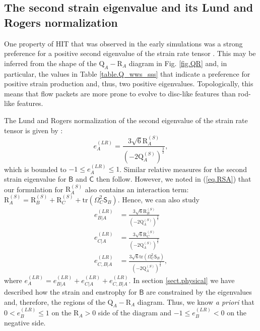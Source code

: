 \documentclass[preprint,amssymb,amsmath,aip,cha]{revtex4-1}
\begin{document}
\subsection{The second strain eigenvalue and its {L}und and {R}ogers normalization}
\label{sect.eLRABC}
One property of HIT that was observed in the early simulations was a strong preference for a positive second eigenvalue of the strain rate tensor \citep{kerr85,ashurst87}. This may be inferred from the shape of the $\mbox{Q}_{A}-\mbox{R}_{A}$ diagram in Fig. \ref{fig.QR} and, in particular, the values in Table \ref{table.Q_wws_sss} that indicate a preference for positive strain production and, thus, two positive eigenvalues. Topologically, this means that flow packets are more prone to evolve to disc-like features than rod-like features. 

The Lund and Rogers normalization of the second eigenvalue of the strain rate tensor is given by \citep{LR94}:
\begin{equation}
e^{(LR)}_{A} = \frac{3\sqrt{6}\mbox{R}^{(S)}_{A}}{\left(-2\mbox{Q}^{(S)}_{A} \right)^{\frac{3}{2}}},
\end{equation}
which is bounded to $-1 \le e^{(LR)}_{A} \le 1$. Similar relative measures for the second strain eigenvalue for $\mathsf{B}$ and $\mathsf{C}$ then follow. However, we noted in (\ref{eq.RSA}) that our formulation for $\mbox{R}^{(S)}_{A}$ also contains an interaction term: $\mbox{R}_{A}^{(S)} = \mbox{R}^{(S)}_{B} + \mbox{R}^{(S)}_{C} +\mbox{tr}(\mathsf{\Omega}_{C}^{2}\mathsf{S}_{B})$. Hence, we can also study
\begin{align}
e^{(LR)}_{B|A} &= \frac{3\sqrt{6}\mbox{R}^{(S)}_{B}}{\left(-2\mbox{Q}^{(S)}_{A} \right)^{\frac{3}{2}}}\\
e^{(LR)}_{C|A} &= \frac{3\sqrt{6}\mbox{R}^{(S)}_{C}}{\left(-2\mbox{Q}^{(S)}_{A} \right)^{\frac{3}{2}}}\\
e^{(LR)}_{C,B|A} &= \frac{3\sqrt{6} \mbox{tr}(\mathsf{\Omega}_{C}^{2}\mathsf{S}_{B})}{\left(-2\mbox{Q}^{(S)}_{A} \right)^{\frac{3}{2}}},
\end{align}
where $e^{(LR)}_{A} = e^{(LR)}_{B|A} + e^{(LR)}_{C|A} + e^{(LR)}_{C,B|A}$. In section \ref{sect.physical} we have described how the strain and enstrophy for $\mathsf{B}$ are constrained by the eigenvalues and, therefore, the regions of the $\mbox{Q}_{A}-\mbox{R}_{A}$ diagram. Thus, we know \emph{a priori} that $0 < e^{(LR)}_{B} \le 1$ on the $\mbox{R}_{A} > 0$ side of the diagram and $-1 \le e^{(LR)}_{B} < 0$ on the negative side.    
\end{document}
